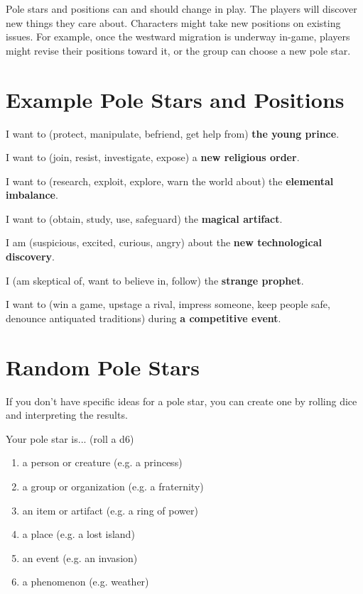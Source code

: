 \documentclass[10pt,oneside,letterpaper,landscape]{memoir}
\begin{document}
\begin{multicols}{3}
Pole stars and positions can and should change in play. The players will discover new things they care about. Characters might take new positions on existing issues. For example, once the westward migration is underway in-game, players might revise their positions toward it, or the group can choose a new pole star.

\vfill\null %

\columnbreak

\section{Example Pole Stars and Positions}

I want to (protect, manipulate, befriend, get help from) \textbf{the young prince}.

I want to (join, resist, investigate, expose) a \textbf{new religious order}.

I want to (research, exploit, explore, warn the world about) the \textbf{elemental imbalance}.

I want to (obtain, study, use, safeguard) the \textbf{magical artifact}.

I am (suspicious, excited, curious, angry) about the \textbf{new technological discovery}.

I (am skeptical of, want to believe in, follow) the \textbf{strange prophet}.

I want to (win a game, upstage a rival, impress someone, keep people safe, denounce antiquated traditions) during \textbf{a competitive event}.

\section{Random Pole Stars}

If you don't have specific ideas for a pole star, you can create one by rolling dice and interpreting the results.

Your pole star is... (roll a d6)

\begin{enumerate}
\item [1:] a person or creature (e.g. a princess)
\item [2:] a group or organization (e.g. a fraternity)
\item [3:] an item or artifact (e.g. a ring of power)
\item [4:] a place (e.g. a lost island)
\item [5:] an event (e.g. an invasion)
\item [6:] a phenomenon (e.g. weather)
\end{enumerate}


\end{multicols}
\end{document}
